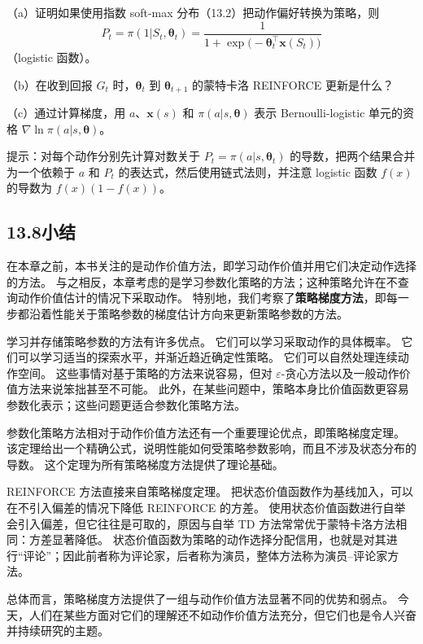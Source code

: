 \documentclass[UTF8, 12pt, fontset=fandol, oneside]{ctexart}
\begin{document}
（a）证明如果使用指数 soft-max 分布（13.2）把动作偏好转换为策略，则
\[
P_t=\pi(1|S_t,\boldsymbol{\theta}_t)=\frac{1}{1+\exp\bigl(-\boldsymbol{\theta}_t^\top\mathbf{x}(S_t)\bigr)}
\]
（logistic 函数）。

（b）在收到回报 $G_t$ 时，$\boldsymbol{\theta}_t$ 到 $\boldsymbol{\theta}_{t+1}$ 的蒙特卡洛 REINFORCE 更新是什么？

（c）通过计算梯度，用 $a$、$\mathbf{x}(s)$ 和 $\pi(a|s,\boldsymbol{\theta})$ 表示 Bernoulli-logistic 单元的资格 $\nabla\ln\pi(a|s,\boldsymbol{\theta})$。

提示：对每个动作分别先计算对数关于 $P_t=\pi(a|s,\boldsymbol{\theta}_t)$ 的导数，把两个结果合并为一个依赖于 $a$ 和 $P_t$ 的表达式，然后使用链式法则，并注意 logistic 函数 $f(x)$ 的导数为 $f(x)(1-f(x))$。

\subsection*{13.8\quad 小结}

在本章之前，本书关注的是动作价值方法，即学习动作价值并用它们决定动作选择的方法。
与之相反，本章考虑的是学习参数化策略的方法；这种策略允许在不查询动作价值估计的情况下采取动作。
特别地，我们考察了\textbf{策略梯度方法}，即每一步都沿着性能关于策略参数的梯度估计方向来更新策略参数的方法。

学习并存储策略参数的方法有许多优点。
它们可以学习采取动作的具体概率。
它们可以学习适当的探索水平，并渐近趋近确定性策略。
它们可以自然处理连续动作空间。
这些事情对基于策略的方法来说容易，但对 $\varepsilon$-贪心方法以及一般动作价值方法来说笨拙甚至不可能。
此外，在某些问题中，策略本身比价值函数更容易参数化表示；这些问题更适合参数化策略方法。

参数化策略方法相对于动作价值方法还有一个重要理论优点，即策略梯度定理。
该定理给出一个精确公式，说明性能如何受策略参数影响，而且不涉及状态分布的导数。
这个定理为所有策略梯度方法提供了理论基础。

REINFORCE 方法直接来自策略梯度定理。
把状态价值函数作为基线加入，可以在不引入偏差的情况下降低 REINFORCE 的方差。
使用状态价值函数进行自举会引入偏差，但它往往是可取的，原因与自举 TD 方法常常优于蒙特卡洛方法相同：方差显著降低。
状态价值函数为策略的动作选择分配信用，也就是对其进行“评论”；因此前者称为评论家，后者称为演员，整体方法称为演员--评论家方法。

总体而言，策略梯度方法提供了一组与动作价值方法显著不同的优势和弱点。
今天，人们在某些方面对它们的理解还不如动作价值方法充分，但它们也是令人兴奋并持续研究的主题。
\end{document}
